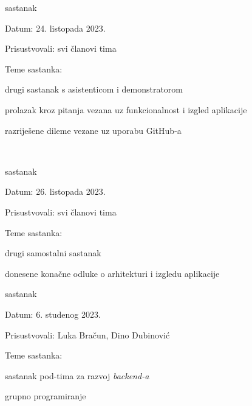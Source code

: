 \begin{packed_enum}
			\item  sastanak
			\item[] \begin{packed_item}
				\item Datum: 24. listopada 2023.
				\item Prisustvovali: svi članovi tima
				\item Teme sastanka:
				\begin{packed_item}
					\item  drugi sastanak s asistenticom i demonstratorom
					\item  prolazak kroz pitanja vezana uz funkcionalnost i izgled aplikacije
					\item  razriješene dileme vezane uz uporabu GitHub-a
				\end{packed_item}
			\end{packed_item}
			\text      \\
			
			\item  sastanak
			\item[] \begin{packed_item}
				\item Datum: 26. listopada 2023.
				\item Prisustvovali: svi članovi tima
				\item Teme sastanka:
				\begin{packed_item}
					\item  drugi samostalni sastanak
					\item  donesene konačne odluke o arhitekturi i izgledu aplikacije
				\end{packed_item}
			\end{packed_item}
			
			\item  sastanak
			\item[] \begin{packed_item}
				\item Datum: 6. studenog 2023.
				\item Prisustvovali: Luka Bračun, Dino Dubinović
				\item Teme sastanka:
				\begin{packed_item}
					\item  sastanak pod-tima za razvoj \textit{backend-a}
					\item  grupno programiranje
				\end{packed_item}
			\end{packed_item}
			

\end{packed_enum}
